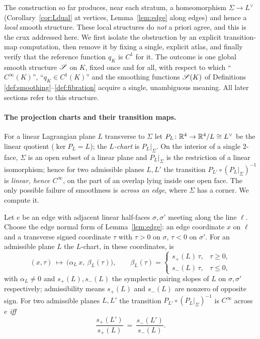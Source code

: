 The construction so far produces, near each stratum, a homeomorphism
$\Sigma\to L^\vee$ (Corollary~\ref{cor:Ldual} at vertices, Lemma~\ref{lem:edge}
along edges) and hence a \emph{local} smooth structure. These local structures do
\emph{not} a priori agree, and this is the crux addressed here. We first isolate
the obstruction by an explicit transition-map computation, then remove it by
fixing a single, explicit atlas, and finally verify that the reference function
$q_K$ is $C^1$ for it. The outcome is one global smooth structure $\mathscr S$ on $K$,
fixed once and for all, with respect to which ``$C^\infty(K)$'', ``$q_K\in C^1(K)$''
and the smoothing functions $\mathscr S(K)$ of Definitions
\ref{def:smoothing}--\ref{def:fibration} acquire a single, unambiguous meaning. All
later sections refer to this structure.

\paragraph{The projection charts and their transition maps.}
For a linear Lagrangian plane $L$ transverse to $\Sigma$ let
$P_L\colon\mathbb{R}^4\to\mathbb{R}^4/L\cong L^\vee$ be the linear quotient
($\ker P_L=L$); the \emph{$L$-chart} is $P_L|_\Sigma$. On the interior of a single
$2$-face, $\Sigma$ is an open subset of a linear plane and $P_L|_\Sigma$ is the
restriction of a linear isomorphism; hence for two admissible planes $L,L'$ the
transition $P_{L'}\circ(P_L|_\Sigma)^{-1}$ is \emph{linear, hence $C^\infty$}, on
the part of an overlap lying inside one open face. The only possible failure of
smoothness is \emph{across an edge}, where $\Sigma$ has a corner. We compute it.

\begin{qeightlemma}\label{lem:transition}
Let $e$ be an edge with adjacent linear half-faces $\sigma,\sigma'$ meeting along
the line $\ell$. Choose the edge normal form of Lemma~\ref{lem:edge}: an edge
coordinate $x$ on $\ell$ and a transverse signed coordinate $\tau$ with $\tau>0$
on $\sigma$, $\tau<0$ on $\sigma'$. For an admissible plane $L$ the $L$-chart, in
these coordinates, is
\[
(x,\tau)\ \longmapsto\ \bigl(\alpha_L\,x,\ \beta_L(\tau)\bigr),\qquad
\beta_L(\tau)=\begin{cases} s_+(L)\,\tau,&\tau\ge0,\\[1mm] s_-(L)\,\tau,&\tau\le0,\end{cases}
\]
with $\alpha_L\ne0$ and $s_+(L),s_-(L)$ the symplectic pairing slopes of $L$ on
$\sigma,\sigma'$ respectively; admissibility means $s_+(L)$ and $s_-(L)$ are
nonzero of opposite sign. For two admissible planes $L,L'$ the transition
$P_{L'}\circ(P_L|_\Sigma)^{-1}$ is $C^\infty$ across $e$ \emph{iff}
\begin{equation}\label{eq:slope-ratio}
\frac{s_+(L')}{s_+(L)}\ =\ \frac{s_-(L')}{s_-(L)}.
\end{equation}
\end{qeightlemma}

